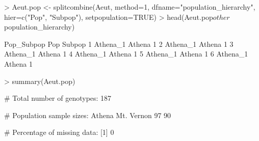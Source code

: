 \documentclass[letterpaper]{article}
\begin{document}
\begin{center}
\end{center}
\begin{Schunk}
\begin{Sinput}
> Aeut.pop <- splitcombine(Aeut, method=1, dfname="population_hierarchy", hier=c("Pop", "Subpop"), setpopulation=TRUE)
> head(Aeut.pop$other$population_hierarchy)
\end{Sinput}
\begin{Soutput}
  Pop_Subpop    Pop Subpop
1   Athena_1 Athena      1
2   Athena_1 Athena      1
3   Athena_1 Athena      1
4   Athena_1 Athena      1
5   Athena_1 Athena      1
6   Athena_1 Athena      1
\end{Soutput}
\begin{Sinput}
> summary(Aeut.pop)
\end{Sinput}
\begin{Soutput}
 # Total number of genotypes:  187 

 # Population sample sizes:  
    Athena Mt. Vernon 
        97         90 

 # Percentage of missing data:  
[1] 0
\end{Soutput}
\end{Schunk}
\end{document}
